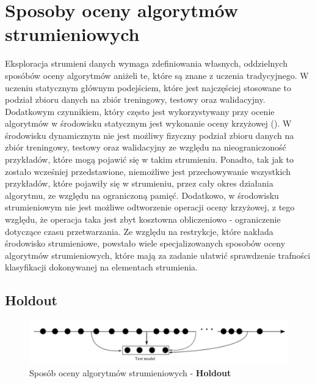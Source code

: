 \section{Sposoby oceny algorytmów strumieniowych}

\noindent Eksploracja strumieni danych wymaga zdefiniowania własnych, oddzielnych sposóbów oceny algorytmów aniżeli te, które są znane z uczenia tradycyjnego. W uczeniu statycznym głównym podejściem, które jest najczęściej stosowane to podział zbioru danych na zbiór treningowy, testowy oraz walidacyjny. Dodatkowym czynnikiem, który często jest wykorzystywany przy ocenie algorytmów w środowisku statycznym jest wykonanie oceny krzyżowej (). W środowisku dynamicznym nie jest możliwy fizyczny podział zbioru danych na zbiór treningowy, testowy oraz walidacyjny ze względu na nieograniczoność przykładów, które mogą pojawić się w takim strumieniu. Ponadto, tak jak to zostało wcześniej przedstawione, niemożliwe jest przechowywanie wszystkich przykładów, które pojawiły się w strumieniu, przez cały okres działania algorytmu, ze względu na ograniczoną pamięć. Dodatkowo, w środowisku strumieniowym nie jest możliwe odtworzenie operacji oceny krzyżowej, z tego względu, że operacja taka jest zbyt kosztowna obliczeniowo - ograniczenie dotyczące czasu przetwarzania. Ze względu na restrykcje, które nakłada środowisko strumieniowe, powstało wiele specjalizowanych sposobów oceny algorytmów strumieniowych, które mają za zadanie ułatwić sprawdzenie trafności klasyfikacji dokonywanej na elementach strumienia.

\newpage

\subsection{Holdout}

\begin{figure}[h] 
    \centering
    \includegraphics[width=15cm]{figures/holdout.JPG}
    \caption{Sposób oceny algorytmów strumieniowych - \textbf{Holdout} \cite{Prezentacja:Strumienie}}\label{Figure:Holdout}
\end{figure}

